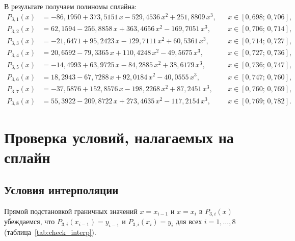 \documentclass[a4paper, final]{article}
\begin{document}
В результате получаем полиномы сплайна:
\begin{align*}
P_{3,1}(x) &= -86{,}1950 + 373{,}5151\,x - 529{,}4536\,x^2 + 251{,}8809\,x^3,
   && x \in [0{,}698;\, 0{,}706],\\
P_{3,2}(x) &= 62{,}1594 - 256{,}8858\,x + 363{,}4656\,x^2 - 169{,}7051\,x^3,
   && x \in [0{,}706;\, 0{,}714],\\
P_{3,3}(x) &= -21{,}6471 + 95{,}2423\,x - 129{,}7111\,x^2 + 60{,}5361\,x^3,
   && x \in [0{,}714;\, 0{,}727],\\
P_{3,4}(x) &= 20{,}6592 - 79{,}3365\,x + 110{,}4248\,x^2 - 49{,}5675\,x^3,
   && x \in [0{,}727;\, 0{,}736],\\
P_{3,5}(x) &= -14{,}4993 + 63{,}9725\,x - 84{,}2885\,x^2 + 38{,}6179\,x^3,
   && x \in [0{,}736;\, 0{,}747],\\
P_{3,6}(x) &= 18{,}2943 - 67{,}7288\,x + 92{,}0184\,x^2 - 40{,}0555\,x^3,
   && x \in [0{,}747;\, 0{,}760],\\
P_{3,7}(x) &= -37{,}5876 + 152{,}8576\,x - 198{,}2268\,x^2 + 87{,}2451\,x^3,
   && x \in [0{,}760;\, 0{,}769],\\
P_{3,8}(x) &= 55{,}3922 - 209{,}8722\,x + 273{,}4635\,x^2 - 117{,}2154\,x^3,
   && x \in [0{,}769;\, 0{,}782].
\end{align*}

\newpage

\section{Проверка условий, налагаемых на сплайн}

\subsection{Условия интерполяции}

Прямой подстановкой граничных значений $x = x_{i-1}$ и $x = x_i$ в
$P_{3,i}(x)$ убеждаемся, что $P_{3,i}(x_{i-1}) = y_{i-1}$ и
$P_{3,i}(x_i) = y_i$ для всех $i = 1, \ldots, 8$
(таблица~\ref{tab:check_interp}).
\end{document}
